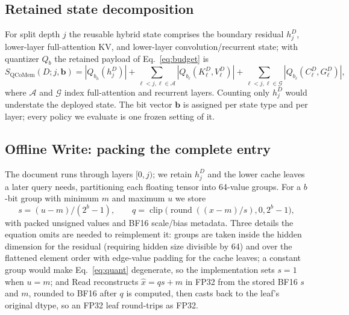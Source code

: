 \documentclass{article}
\begin{document}
\subsection{Retained state decomposition}
\label{sec:decomposition}

For split depth $j$ the reusable hybrid state comprises the boundary residual
$h_j^D$, lower-layer full-attention KV, and lower-layer convolution/recurrent
state; with quantizer $Q_b$ the retained payload of Eq.~\ref{eq:budget} is
\begin{equation}
 S_{\mathrm{QCoMem}}(D;j,\mathbf b)=|Q_{b_h}(h_j^D)|+
 \sum_{\ell<j,\ell\in\mathcal A}|Q_{b_\ell}(K^D_\ell,V^D_\ell)|+
 \sum_{\ell<j,\ell\in\mathcal G}|Q_{b_\ell}(C^D_\ell,G^D_\ell)|,
\end{equation}
where $\mathcal A$ and $\mathcal G$ index full-attention and recurrent layers.
Counting only $h_j^D$ would understate the deployed state.  The bit vector
$\mathbf b$ is assigned per state type and per layer; every policy we evaluate
is one frozen setting of it.

\subsection{Offline Write: packing the complete entry}
\label{sec:write}

The document runs through layers $[0,j)$; we retain $h_j^D$ and the lower cache
leaves a later query needs, partitioning each floating tensor into 64-value
groups.  For a $b$-bit group with minimum $m$ and maximum $u$ we store
\begin{equation}
 s=(u-m)/(2^b-1),\qquad q=\operatorname{clip}
 \bigl(\operatorname{round}((x-m)/s),0,2^b-1\bigr),
 \label{eq:quant}
\end{equation}
with packed unsigned values and BF16 scale/bias metadata.  Three details the
equation omits are needed to reimplement it: groups are taken inside the hidden
dimension for the residual (requiring hidden size divisible by 64) and over the
flattened element order with edge-value padding for the cache leaves; a constant
group would make Eq.~\ref{eq:quant} degenerate, so the implementation sets $s=1$
when $u=m$; and Read reconstructs $\hat x=qs+m$ in FP32 from the stored BF16 $s$
and $m$, rounded to BF16 after $q$ is computed, then casts back to the leaf's
original dtype, so an FP32 leaf round-trips as FP32.
\end{document}
